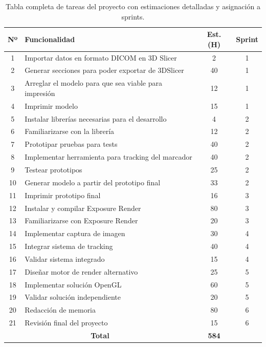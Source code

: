 \begin{table}[h!]
  \centering
  \begin{tabular}{|c|p{7.5cm}|c|c|}
  \hline
  \rowcolor{udcpink!25}
  \textbf{Nº} & \textbf{Funcionalidad} & \textbf{Est. (H)} & \textbf{Sprint} \\\hline
  1     &   Importar datos en formato DICOM en 3D Slicer    &   2     & 1 \\
  2     &   Generar secciones para poder exportar de 3DSlicer &   40    & 1 \\
  3     &   Arreglar el modelo para que sea viable para impresión &   12    & 1 \\
  4     &   Imprimir modelo                                  &   15    & 1 \\
  5     &   Instalar librerías necesarias para el desarrollo &   4     & 2 \\
  6     &   Familiarizarse con la librería                   &   12    & 2 \\
  7     &   Prototipar pruebas para tests                    &   40    & 2 \\
  8     &   Implementar herramienta para tracking del marcador &   40    & 2 \\  
  9     &   Testear prototipos                               &   25    & 2 \\
  10    &   Generar modelo a partir del prototipo final      &   33    & 2 \\
  11    &   Imprimir prototipo final                         &   16    & 3 \\
  12    &   Instalar y compilar Exposure Render              &   80    & 3 \\
  13    &   Familiarizarse con Exposure Render               &   20    & 3 \\
  14    &   Implementar captura de imagen                    &   30    & 4 \\
  15    &   Integrar sistema de tracking                     &   40    & 4 \\
  16    &   Validar sistema integrado                        &   15    & 4 \\
  17    &   Diseñar motor de render alternativo              &   25    & 5 \\
  18    &   Implementar solución OpenGL                      &   60    & 5 \\
  19    &   Validar solución independiente                   &   20    & 5 \\
  20    &   Redacción de memoria                             &   80    & 6 \\
  21    &   Revisión final del proyecto                      &   15    & 6 \\
  \hline
  \multicolumn{2}{|c|}{\textbf{Total}} & \textbf{584} & \\
  \hline
  \end{tabular}
  \caption{Tabla completa de tareas del proyecto con estimaciones detalladas y asignación a sprints.}
  \label{tab:tareas_completa}
\end{table}
